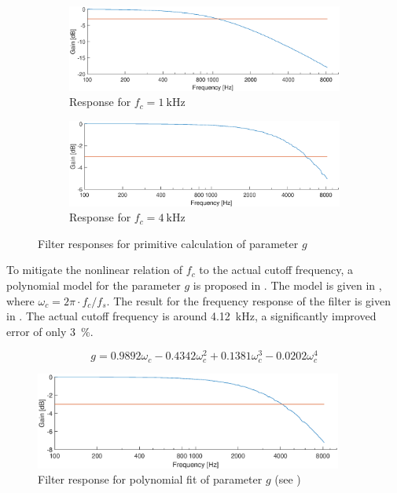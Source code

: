 \documentclass[a4paper, 12pt]{article}
\begin{document}
\begin{figure} [!ht]
	\centering
	\begin{subfigure}[b]{0.9\textwidth}
		\centering
		\includegraphics[width=\textwidth]{primitive-response-1000.eps}
		\caption{Response for $f_c = \SI{1}{\kilo\hertz}$}
		\label{subfig:prim-resp-1000}
	\end{subfigure}
	\begin{subfigure}[b]{0.9\textwidth}
		\centering
		\includegraphics[width=\textwidth]{primitive-response-4000.eps}
		\caption{Response for $f_c = \SI{4}{\kilo\hertz}$}
		\label{subfig:prim-resp-4000}
	\end{subfigure}
	\caption{Filter responses for primitive calculation of parameter $g$}
	\label{fig:prim-resp}
\end{figure}

To mitigate the nonlinear relation of $f_c$ to the actual cutoff frequency, a polynomial model for the parameter $g$ is proposed in \cite{Vaelimaeki2006}. The model is given in , where $\omega_c = 2 \pi \cdot f_c / f_s$. The result for the frequency response of the filter is given in . The actual cutoff frequency is around \SI{4.12}{\kilo\hertz}, a significantly improved error of only \SI{3}{\percent}. 

\begin{equation}
	\label{eq:polynom-fit}
	g = 0.9892 \omega_c - 0.4342 \omega_c^2 + 0.1381 \omega_c^3 - 0.0202 \omega_c^4
\end{equation}

\begin{figure}
	\centering
	\includegraphics[width=0.9\textwidth]{primitive-response-4000-improved.eps}
	\caption{Filter response for polynomial fit of parameter $g$ (see )}
	\label{fig:ext-resp}
\end{figure}
\end{document}

